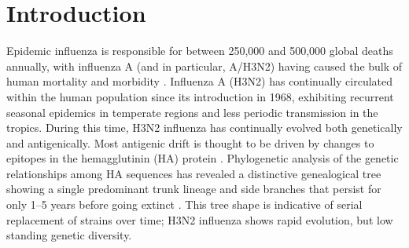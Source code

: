 \documentclass[11pt,oneside,letterpaper]{article}
\begin{document}


\section*{Introduction}

Epidemic influenza is responsible for between 250,000 and 500,000 global deaths annually, with influenza A (and in particular, A/H3N2) having caused the bulk of human mortality and morbidity \cite{flufactsheet}.  Influenza A (H3N2) has continually circulated within the human population since its introduction in 1968, exhibiting recurrent seasonal epidemics in temperate regions and less periodic transmission in the tropics.  During this time, H3N2 influenza has continually evolved both genetically and antigenically.  Most antigenic drift is thought to be driven by changes to epitopes in the hemagglutinin (HA) protein \cite{Nelson07NatRevGenet}.  Phylogenetic analysis of the genetic relationships among HA sequences has revealed a distinctive genealogical tree showing a single predominant trunk lineage and side branches that persist for only 1--5 years before going extinct \cite{Fitch97}.  This tree shape is indicative of serial replacement of strains over time; H3N2 influenza shows rapid evolution, but low standing genetic diversity.
\end{document}
